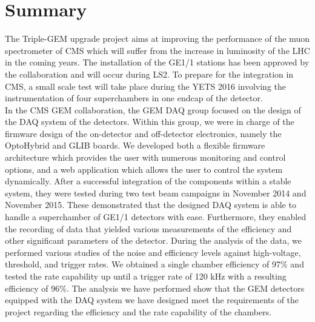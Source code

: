\chapter{Summary}
\label{chap:II-7-summary}

  The Triple-GEM upgrade project aims at improving the performance of the muon spectrometer of CMS which will suffer from the increase in luminosity of the LHC in the coming years. The installation of the GE1/1 stations has been approved by the collaboration and will occur during LS2. To prepare for the integration in CMS, a small scale test will take place during the YETS 2016 involving the instrumentation of four superchambers in one endcap of the detector. \\

  In the CMS GEM collaboration, the GEM DAQ group focused on the design of the DAQ system of the detectors. Within this group, we were in charge of the firmware design of the on-detector and off-detector electronics, namely the OptoHybrid and GLIB boards. We developed both a flexible firmware architecture which provides the user with numerous monitoring and control options, and a web application which allows the user to control the system dynamically. After a successful integration of the components within a stable system, they were tested during two test beam campaigns in November 2014 and November 2015. These demonstrated that the designed DAQ system is able to handle a superchamber of GE1/1 detectors with ease. Furthermore, they enabled the recording of data that yielded various measurements of the efficiency and other significant parameters of the detector. During the analysis of the data, we performed various studies of the noise and efficiency levels against high-voltage, threshold, and trigger rates. We obtained a single chamber efficiency of 97\% and tested the rate capability up until a trigger rate of 120 kHz with a resulting efficiency of 96\%. The analysis we have performed show that the GEM detectors equipped with the DAQ system we have designed meet the requirements of the project regarding the efficiency and the rate capability of the chambers. \\

